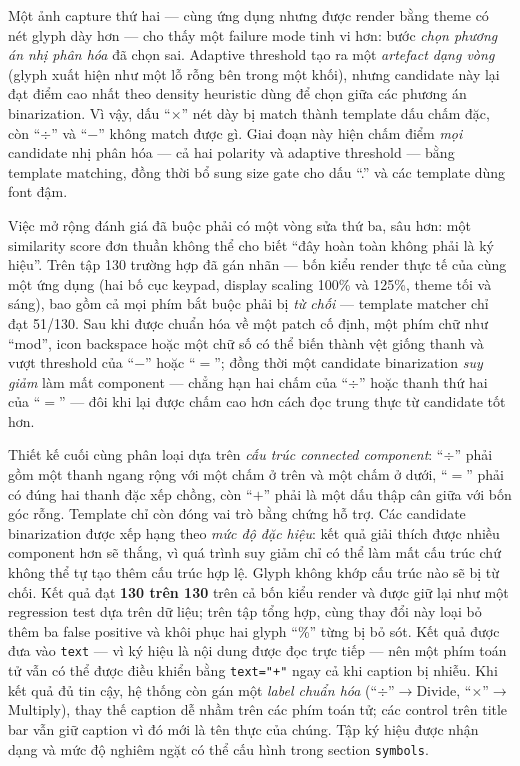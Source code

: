 \documentclass[11pt,a4paper]{article}
\newcommand{\code}[1]{\texttt{#1}}
\begin{document}
Một ảnh capture thứ hai --- cùng ứng dụng nhưng được render bằng theme có nét glyph
dày hơn --- cho thấy một failure mode tinh vi hơn: bước \emph{chọn phương án nhị
phân hóa} đã chọn sai. Adaptive threshold tạo ra một \emph{artefact dạng vòng}
(glyph xuất hiện như một lỗ rỗng bên trong một khối), nhưng candidate này lại đạt
điểm cao nhất theo density heuristic dùng để chọn giữa các phương án binarization.
Vì vậy, dấu ``$\times$'' nét dày bị match thành template dấu chấm đặc, còn
``$\div$'' và ``$-$'' không match được gì. Giai đoạn này hiện chấm điểm
\emph{mọi} candidate nhị phân hóa --- cả hai polarity và adaptive threshold ---
bằng template matching, đồng thời bổ sung size gate cho dấu ``.'' và các template
dùng font đậm.

Việc mở rộng đánh giá đã buộc phải có một vòng sửa thứ ba, sâu hơn: một similarity
score đơn thuần không thể cho biết ``đây hoàn toàn không phải là ký hiệu''. Trên
tập 130 trường hợp đã gán nhãn --- bốn kiểu render thực tế của cùng một ứng dụng
(hai bố cục keypad, display scaling 100\% và 125\%, theme tối và sáng), bao gồm
cả mọi phím bắt buộc phải bị \emph{từ chối} --- template matcher chỉ đạt 51/130.
Sau khi được chuẩn hóa về một patch cố định, một phím chữ như ``mod'', icon
backspace hoặc một chữ số có thể biến thành vệt giống thanh và vượt threshold của
``$-$'' hoặc ``$=$''; đồng thời một candidate binarization \emph{suy giảm} làm
mất component --- chẳng hạn hai chấm của ``$\div$'' hoặc thanh thứ hai của
``$=$'' --- đôi khi lại được chấm cao hơn cách đọc trung thực từ candidate tốt hơn.

Thiết kế cuối cùng phân loại dựa trên \emph{cấu trúc connected component}:
``$\div$'' phải gồm một thanh ngang rộng với một chấm ở trên và một chấm ở dưới,
``$=$'' phải có đúng hai thanh đặc xếp chồng, còn ``$+$'' phải là một dấu thập cân
giữa với bốn góc rỗng. Template chỉ còn đóng vai trò bằng chứng hỗ trợ. Các
candidate binarization được xếp hạng theo \emph{mức độ đặc hiệu}: kết quả giải
thích được nhiều component hơn sẽ thắng, vì quá trình suy giảm chỉ có thể làm mất
cấu trúc chứ không thể tự tạo thêm cấu trúc hợp lệ. Glyph không khớp cấu trúc nào
sẽ bị từ chối. Kết quả đạt \textbf{130 trên 130} trên cả bốn kiểu render và được
giữ lại như một regression test dựa trên dữ liệu; trên tập tổng hợp, cùng thay đổi
này loại bỏ thêm ba false positive và khôi phục hai glyph ``\%'' từng bị bỏ sót.
Kết quả được đưa vào \code{text} --- vì ký hiệu là nội dung được đọc trực tiếp --- nên một
phím toán tử vẫn có thể được điều khiển bằng \code{text="+"} ngay cả khi caption
bị nhiễu. Khi kết quả đủ tin cậy, hệ thống còn gán một \emph{label chuẩn hóa}
(``$\div$''$\rightarrow$Divide, ``$\times$''$\rightarrow$Multiply), thay thế
caption dễ nhầm trên các phím toán tử; các control trên title bar vẫn giữ caption vì
đó mới là tên thực của chúng. Tập ký hiệu được nhận dạng và mức độ nghiêm ngặt có
thể cấu hình trong section \code{symbols}.
\end{document}
